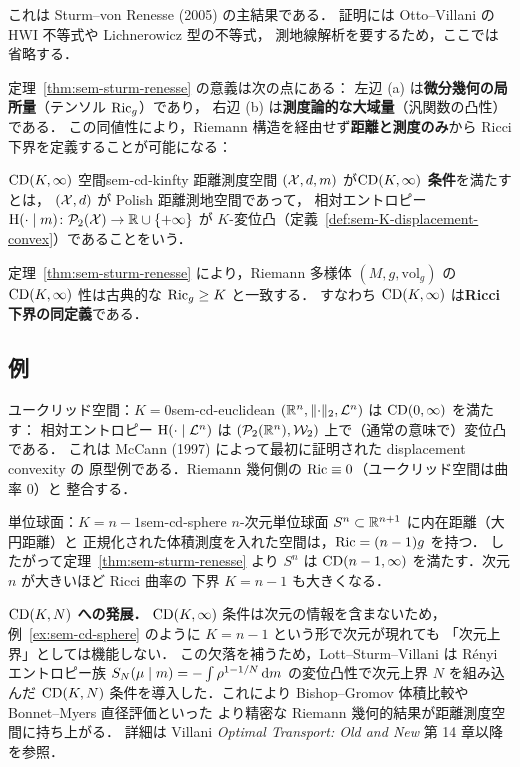 これは Sturm--von Renesse (2005) の主結果である．
証明には Otto--Villani の HWI 不等式や Lichnerowicz 型の不等式，
測地線解析を要するため，ここでは省略する．

定理~\ref{thm:sem-sturm-renesse} の意義は次の点にある：
左辺 (a) は\textbf{微分幾何の局所量}（テンソル $\operatorname{Ric}_g$）であり，
右辺 (b) は\textbf{測度論的な大域量}（汎関数の凸性）である．
この同値性により，Riemann 構造を経由せず\textbf{距離と測度のみ}から
Ricci 下界を定義することが可能になる：

\begin{definition}{$\mathrm{CD}(K, \infty)$ 空間}{sem-cd-kinfty}
  距離測度空間 $(\mathcal{X}, d, m)$ が\textbf{$\mathrm{CD}(K, \infty)$ 条件}を満たすとは，
  $(\mathcal{X}, d)$ が Polish 距離測地空間であって，
  相対エントロピー $\mathrm{H}(\cdot \mid m) \colon \mathcal{P}_2(\mathcal{X}) \to \mathbb{R} \cup \{+\infty\}$
  が $K$-変位凸（定義~\ref{def:sem-K-displacement-convex}）であることをいう．
\end{definition}

定理~\ref{thm:sem-sturm-renesse} により，Riemann 多様体 $(M, g, \mathrm{vol}_g)$ の
$\mathrm{CD}(K, \infty)$ 性は古典的な $\operatorname{Ric}_g \geq K$ と一致する．
すなわち $\mathrm{CD}(K, \infty)$ は\textbf{Ricci 下界の同定義}である．

\subsection{例}

\begin{example}{ユークリッド空間：$K = 0$}{sem-cd-euclidean}
  $(\mathbb{R}^n, \lVert \cdot \rVert_2, \mathcal{L}^n)$ は $\mathrm{CD}(0, \infty)$ を満たす：
  相対エントロピー $\mathrm{H}(\cdot \mid \mathcal{L}^n)$ は
  $(\mathcal{P}_2(\mathbb{R}^n), \mathcal{W}_2)$ 上で（通常の意味で）変位凸である．
  これは McCann (1997) によって最初に証明された displacement convexity の
  原型例である．Riemann 幾何側の $\operatorname{Ric} \equiv 0$（ユークリッド空間は曲率 0）と
  整合する．
\end{example}

\begin{example}{単位球面：$K = n - 1$}{sem-cd-sphere}
  $n$-次元単位球面 $S^n \subset \mathbb{R}^{n+1}$ に内在距離（大円距離）と
  正規化された体積測度を入れた空間は，$\operatorname{Ric} = (n - 1) g$ を持つ．
  したがって定理~\ref{thm:sem-sturm-renesse} より
  $S^n$ は $\mathrm{CD}(n - 1, \infty)$ を満たす．次元 $n$ が大きいほど Ricci 曲率の
  下界 $K = n - 1$ も大きくなる．
\end{example}

\begin{memo*}
  \textbf{$\mathrm{CD}(K, N)$ への発展．}
  $\mathrm{CD}(K, \infty)$ 条件は次元の情報を含まないため，
  例~\ref{ex:sem-cd-sphere} のように $K = n - 1$ という形で次元が現れても
  「次元上界」としては機能しない．
  この欠落を補うため，Lott--Sturm--Villani は Rényi エントロピー族
  $S_N(\mu \mid m) = -\int \rho^{1 - 1/N} \, \mathrm{d} m$ の変位凸性で次元上界 $N$ を組み込んだ
  $\mathrm{CD}(K, N)$ 条件を導入した．これにより
  Bishop--Gromov 体積比較や Bonnet--Myers 直径評価といった
  より精密な Riemann 幾何的結果が距離測度空間に持ち上がる．
  詳細は Villani \textit{Optimal Transport: Old and New} 第 14 章以降を参照．
\end{memo*}

